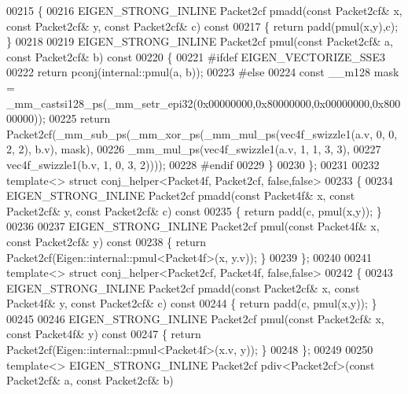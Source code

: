 \begin{DoxyCode}
00215 \{
00216   EIGEN\_STRONG\_INLINE Packet2cf pmadd(\textcolor{keyword}{const} Packet2cf& x, \textcolor{keyword}{const} Packet2cf& y, \textcolor{keyword}{const} Packet2cf& c)\textcolor{keyword}{ const}
00217 \textcolor{keyword}{  }\{ \textcolor{keywordflow}{return} padd(pmul(x,y),c); \}
00218 
00219   EIGEN\_STRONG\_INLINE Packet2cf pmul(\textcolor{keyword}{const} Packet2cf& a, \textcolor{keyword}{const} Packet2cf& b)\textcolor{keyword}{ const}
00220 \textcolor{keyword}{  }\{
00221 \textcolor{preprocessor}{    #ifdef EIGEN\_VECTORIZE\_SSE3}
00222     \textcolor{keywordflow}{return} pconj(internal::pmul(a, b));
00223 \textcolor{preprocessor}{    #else}
00224     \textcolor{keyword}{const} \_\_m128 mask = \_mm\_castsi128\_ps(\_mm\_setr\_epi32(0x00000000,0x80000000,0x00000000,0x80000000));
00225     \textcolor{keywordflow}{return} Packet2cf(\_mm\_sub\_ps(\_mm\_xor\_ps(\_mm\_mul\_ps(vec4f\_swizzle1(a.v, 0, 0, 2, 2), b.v), mask),
00226                                 \_mm\_mul\_ps(vec4f\_swizzle1(a.v, 1, 1, 3, 3),
00227                                            vec4f\_swizzle1(b.v, 1, 0, 3, 2))));
00228 \textcolor{preprocessor}{    #endif}
00229   \}
00230 \};
00231 
00232 \textcolor{keyword}{template}<> \textcolor{keyword}{struct }conj\_helper<Packet4f, Packet2cf, false,false>
00233 \{
00234   EIGEN\_STRONG\_INLINE Packet2cf pmadd(\textcolor{keyword}{const} Packet4f& x, \textcolor{keyword}{const} Packet2cf& y, \textcolor{keyword}{const} Packet2cf& c)\textcolor{keyword}{ const}
00235 \textcolor{keyword}{  }\{ \textcolor{keywordflow}{return} padd(c, pmul(x,y)); \}
00236 
00237   EIGEN\_STRONG\_INLINE Packet2cf pmul(\textcolor{keyword}{const} Packet4f& x, \textcolor{keyword}{const} Packet2cf& y)\textcolor{keyword}{ const}
00238 \textcolor{keyword}{  }\{ \textcolor{keywordflow}{return} Packet2cf(Eigen::internal::pmul<Packet4f>(x, y.v)); \}
00239 \};
00240 
00241 \textcolor{keyword}{template}<> \textcolor{keyword}{struct }conj\_helper<Packet2cf, Packet4f, false,false>
00242 \{
00243   EIGEN\_STRONG\_INLINE Packet2cf pmadd(\textcolor{keyword}{const} Packet2cf& x, \textcolor{keyword}{const} Packet4f& y, \textcolor{keyword}{const} Packet2cf& c)\textcolor{keyword}{ const}
00244 \textcolor{keyword}{  }\{ \textcolor{keywordflow}{return} padd(c, pmul(x,y)); \}
00245 
00246   EIGEN\_STRONG\_INLINE Packet2cf pmul(\textcolor{keyword}{const} Packet2cf& x, \textcolor{keyword}{const} Packet4f& y)\textcolor{keyword}{ const}
00247 \textcolor{keyword}{  }\{ \textcolor{keywordflow}{return} Packet2cf(Eigen::internal::pmul<Packet4f>(x.v, y)); \}
00248 \};
00249 
00250 \textcolor{keyword}{template}<> EIGEN\_STRONG\_INLINE Packet2cf pdiv<Packet2cf>(\textcolor{keyword}{const} Packet2cf& a, \textcolor{keyword}{const} Packet2cf& b)

\end{DoxyCode}
